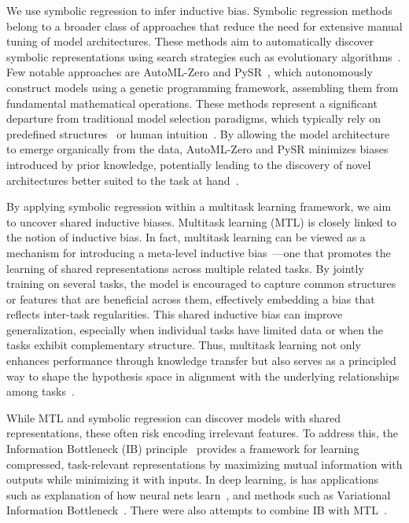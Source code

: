 \documentclass[14pt]{extarticle}
\begin{document}
We use symbolic regression to infer inductive bias. Symbolic regression methods belong to a broader class of approaches that reduce the need for extensive manual tuning of model architectures. These methods aim to automatically discover symbolic representations using search strategies such as evolutionary algorithms~\citep{cosmo_ind_bias_sym_regression}. 
Few notable approaches are AutoML-Zero\citep{automl-zero} and PySR~\citep{Cranmer2023InterpretableML}, which autonomously construct models using a genetic programming framework, assembling them from fundamental mathematical operations. These methods represent a significant departure from traditional model selection paradigms, which typically rely on predefined structures~\citep{alex_net} or human intuition~\citep{zoph2016neural}. By allowing the model architecture to emerge organically from the data, AutoML-Zero and PySR minimizes biases introduced by prior knowledge, potentially leading to the discovery of novel architectures better suited to the task at hand~\citep{Dorrell2022MetaLearningTI, Liu2024KANKN}.


By applying symbolic regression within a multitask learning framework, we aim to uncover shared inductive biases. Multitask learning (MTL) is closely linked to the notion of inductive bias. In fact, multitask learning can be viewed as a mechanism for introducing a meta-level inductive bias~\citep{multitask_ind_bias, baxter_ind_bias}---one that promotes the learning of shared representations across multiple related tasks. By jointly training on several tasks, the model is encouraged to capture common structures or features that are beneficial across them, effectively embedding a bias that reflects inter-task regularities. This shared inductive bias can improve generalization, especially when individual tasks have limited data or when the tasks exhibit complementary structure. Thus, multitask learning not only enhances performance through knowledge transfer but also serves as a principled way to shape the hypothesis space in alignment with the underlying relationships among tasks~\citep{survey_mtl}. 


While MTL and symbolic regression can discover models with shared representations, these often risk encoding irrelevant features. To address this, the Information Bottleneck (IB) principle~\citep{Tishby2000TheIB} provides a framework for learning compressed, task-relevant representations by maximizing mutual information with outputs while minimizing it with inputs. In deep learning, is has applications such as explanation of how neural nets learn~\citep{ShwartzZiv2017OpeningTB}, and methods such as Variational Information Bottleneck~\citep{Alemi2017DeepVI}. There were also attempts to combine IB with MTL~\citep{Qian2020MultiTaskVI}.
\end{document}
